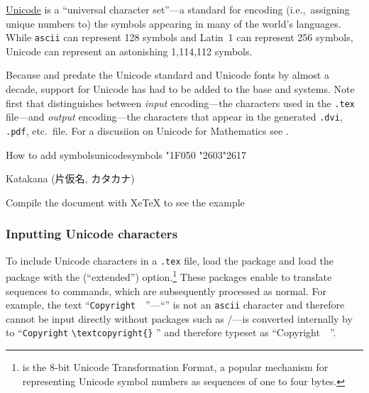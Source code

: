 
\href{http://www.unicode.org/}{Unicode} is a ``universal character
set''---a standard for encoding (i.e.,~assigning unique numbers to)
the symbols appearing in many of the world's languages.  While \texttt{ascii}
can represent 128 symbols and Latin~1 can represent 256 symbols,
Unicode can represent an astonishing 1,114,112 symbols.

Because \tex and \latex{} predate the Unicode standard and Unicode
fonts by almost a decade, support for Unicode has had to be added to
the base \tex{} and \latex{} systems.  Note first that \latex{}
distinguishes between \emph{input} encoding---the characters used in
the \texttt{.tex} file---and \emph{output} encoding---the characters
that appear in the generated \texttt{.dvi}, \texttt{.pdf}, etc.\ file.
For a discusiion on Unicode for Mathematics see \citep{beetona}.

\begin{texexample}{How to add symbols}{unicodesymbols}
\ifxetex
  \codetwothousand\char"1F050 \char"2603\char"2617
  {\codetwothousand {} 
    Katakana (片仮名, カタカナ)
   \codetwothousandone {}
   \symbola {}
   
  }
\else
   Compile the document with XeTeX to see the example
\fi
\end{texexample}

\subsubsection{Inputting Unicode characters}

To include Unicode characters in a \texttt{.tex} file, load the
 package and load the  package with the
 (``\utfviii extended'')
option.\footnote{\utfviii is the 8-bit Unicode Transformation Format,
  a popular mechanism for representing Unicode symbol numbers as
  sequences of one to four bytes.}  These packages enable \latex{} to
translate \utfviii sequences to \latex{} commands, which are
subsequently processed as normal.  For example, the \utfviii text
``\texttt{Copyright~\textcopyright\ \the\year}''---``\texttt{\textcopyright}''
is not an \texttt{ascii} character and therefore cannot be input directly
without packages such as /---is
converted internally by  to ``\texttt{Copyright}
\verb+\textcopyright{}+ \texttt{\the\year}'' and therefore typeset as
``Copyright~\textcopyright\ \the\year''.


